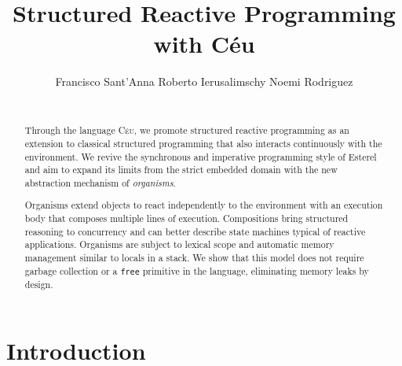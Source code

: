 \documentclass{acm_proc_article-sp}
\newcommand{\CEU}{\textsc{C\'{e}u}\xspace}
\newcommand{\code}[1] {{\small{\texttt{#1}}}}
\newcommand{\1}{\;}
\newcommand{\2}{\;\;}
\newcommand{\3}{\;\;\;}
\newcommand{\5}{\;\;\;\;\;}
\begin{document}
\sloppy

\title {
    Structured Reactive Programming with C\'eu
}

\author{
    \alignauthor
    Francisco Sant'Anna \hspace{1cm} Roberto Ierusalimschy  \hspace{1cm} Noemi Rodriguez  \\
     \\
}

\maketitle

\begin{abstract}
Through the language \CEU, we promote structured reactive programming as an 
extension to classical structured programming that also interacts continuously 
with the environment.
%
We revive the synchronous and imperative programming style of Esterel and aim 
to expand its limits from the strict embedded domain with the new abstraction 
mechanism of \emph{organisms}.

Organisms extend objects to react independently to the environment with an 
execution body that composes multiple lines of execution.
%
Compositions bring structured reasoning to concurrency and can better describe 
state machines typical of reactive applications.
%
Organisms are subject to lexical scope and automatic memory management similar 
to locals in a stack.
We show that this model does not require garbage collection or a \code{free} 
primitive in the language, eliminating memory leaks by design.
\end{abstract}




\section{Introduction}
\label{sec.intro}
\end{document}
